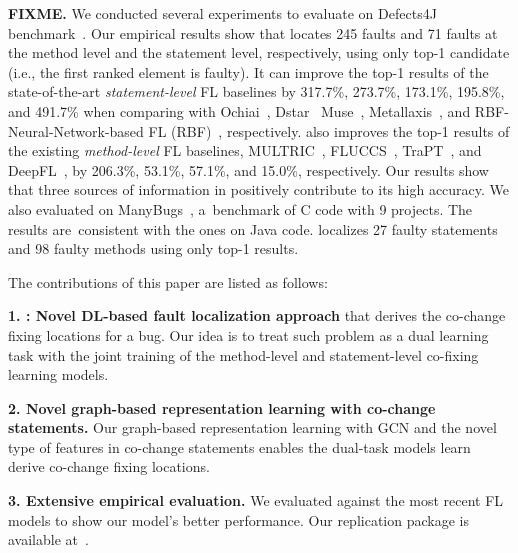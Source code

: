 {\bf FIXME.} We conducted several experiments to evaluate {\tool} on
Defects4J benchmark~\cite{defects4j}. Our empirical results show that
\tool locates 245 faults and 71 faults at the method level and the
statement level, respectively, using only top-1 candidate (i.e., the
first ranked element is faulty). It can improve the top-1 results of
the state-of-the-art \textit{statement-level} FL baselines by 317.7\%,
273.7\%, 173.1\%, 195.8\%, and 491.7\% when comparing with
Ochiai~\cite{Ochiai}, Dstar~\cite{DStar} Muse~\cite{MUSE},
Metallaxis~\cite{Metallaxis}, and RBF-Neural-Network-based FL
(RBF)~\cite{RBF_Neural_Network}, respectively.  {\tool} also improves
the top-1 results of the existing \textit{method-level} FL baselines,
MULTRIC~\cite{MULTRIC}, FLUCCS~\cite{FLUCCS}, TraPT~\cite{TraPT}, and
DeepFL~\cite{DeepFL}, by 206.3\%, 53.1\%, 57.1\%, and 15.0\%,
respectively. Our results show that three sources of information in
{\tool} positively contribute to its high accuracy. We also evaluated
{\tool} on ManyBugs~\cite{LeGoues15tse}, a~ben\-chmark of C code with
9 projects. The results are~consistent with the ones on Java code.
{\tool} localizes 27 faulty statements and 98 faulty methods using
only top-1 results.

The contributions of this paper are listed as follows:

{\bf 1. {\tool}: Novel DL-based fault localization approach} that
derives the co-change fixing locations for a bug. Our idea is
to treat such problem as a dual learning task with the joint training
of the method-level and statement-level co-fixing learning models.

{\bf 2. Novel graph-based representation learning with co-change
  statements.} Our graph-based representation learning with GCN
and the novel type of features in co-change statements enables
the dual-task models learn derive co-change fixing locations.

{\bf 3. Extensive empirical evaluation.} We evaluated {\tool} against
the most recent FL models to show our model's better performance. Our
replication package is available at~\cite{FixLocator2022}.

